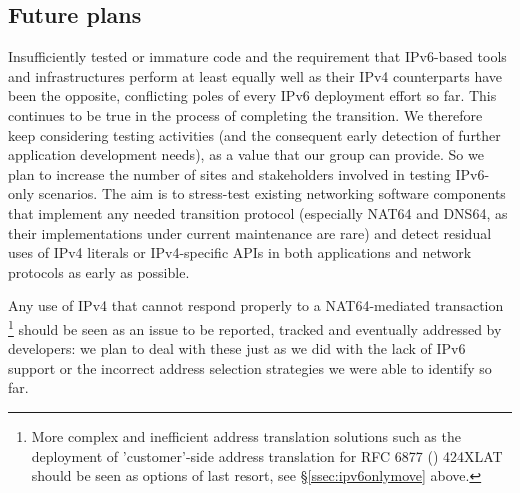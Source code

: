 \subsection{Future plans}
Insufficiently tested or immature code and the requirement that IPv6-based
tools and infrastructures perform at least equally well as their IPv4
counterparts have been the opposite, conflicting poles of every IPv6
deployment effort so far. This continues to be true in the process
of completing the transition. We therefore keep considering
testing activities (and the consequent early detection of further application
development needs), as a value that our group can provide. So we plan
to increase the number of sites and stakeholders involved in testing IPv6-only 
scenarios. The aim is to stress-test existing networking software components
that implement any needed transition protocol (especially NAT64 and DNS64, as 
their implementations under current maintenance are rare) and detect
residual uses of IPv4 literals or IPv4-specific APIs in both applications and
network protocols as early as possible.\par
Any use of IPv4 that cannot respond properly to a NAT64-mediated
transaction
\footnote{More complex and inefficient address
translation solutions such as the deployment of 'customer'-side address
translation for RFC 6877 (\cite{rfc}) 424XLAT should be
seen as options of last resort, see \S \ref{ssec:ipv6onlymove} above.}
should be seen as an issue to be reported, tracked and eventually
addressed by developers: we plan to deal with these just as we did
with the lack of IPv6 support or the incorrect address selection
strategies we were able to identify so far.
